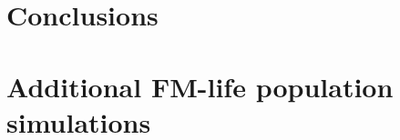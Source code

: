 \documentclass[phd, logo, twoside]{infthesis}
\begin{document}
\chapter{Conclusions}
\label{chp:concl}



\singlespace

% 

\printbibliography[heading=bibintoc]

\appendix
\chapter{Additional FM-life population simulations}
\label{app:fmLifeMore}


\end{document}
